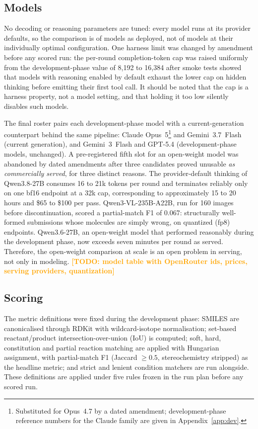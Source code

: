 \documentclass{article}
\newcommand{\TODO}[1]{\textcolor{orange}{\textbf{[TODO: #1]}}}
\begin{document}
\subsection{Models}
No decoding or reasoning parameters are
tuned: every model runs at its provider defaults, so the comparison is
of models as deployed, not of models at their individually optimal
configuration. One harness limit was changed by amendment before any
scored run: the per-round completion-token cap was raised uniformly
from the development-phase value of 8{,}192 to 16{,}384 after smoke tests showed
that models with reasoning enabled by default exhaust the lower cap on
hidden thinking before emitting their first tool call. It should be
noted that the cap is a harness property, not a model setting, and that
holding it too low silently disables such models.

The final roster pairs each development-phase model with a
current-generation counterpart behind the same pipeline: Claude
Opus~5\footnote{Substituted for Opus~4.7 by a dated amendment;
development-phase reference numbers for the Claude family are given in
Appendix~\ref{app:dev}.} and Gemini~3.7~Flash (current generation), and
Gemini~3~Flash and GPT-5.4 (development-phase models, unchanged). A
pre-registered fifth slot for an open-weight model was abandoned by
dated amendments after three candidates proved unusable \emph{as
commercially served}, for three distinct reasons. The provider-default
thinking of Qwen3.8-27B consumes 16 to 21k tokens per round and
terminates reliably only on one bf16 endpoint at a 32k cap,
corresponding to approximately 15 to 20 hours and \$65 to \$100 per
pass. Qwen3-VL-235B-A22B, run for 160 images before discontinuation,
scored a partial-match F1 of 0.067: structurally well-formed
submissions whose molecules are simply wrong, on quantized (fp8)
endpoints. Qwen3.6-27B, an open-weight model that performed reasonably
during the development phase, now exceeds seven minutes per round as
served. Therefore, the open-weight comparison at scale is an open
problem in serving, not only in modeling.
\TODO{model table with OpenRouter ids, prices, serving providers,
quantization}

\subsection{Scoring}
The metric definitions were fixed during the development phase: SMILES are
canonicalised through RDKit with wildcard-isotope normalisation;
set-based reactant/product intersection-over-union (IoU) is computed;
soft, hard, constitution and partial reaction matching are applied with
Hungarian assignment, with partial-match F1 (Jaccard $\geq 0.5$,
stereochemistry stripped) as the headline metric; and strict and
lenient condition matchers are run alongside. These definitions are
applied under five rules frozen in the run plan before any scored run.
\end{document}
